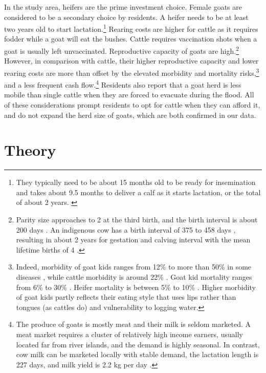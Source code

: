 	In the study area, heifers are the prime investment choice. Female goats are considered to be a secondary choice by residents. A heifer needs to be at least two years old to start lactation.\footnote{They typically need to be about 15 months old to be ready for insemination and takes about 9.5 months to deliver a calf as it starts lactation, or the total of about 2 years. \label{heifer2years}} Rearing costs are higher for cattle as it requires fodder while a goat will eat the bushes. Cattle requires vaccination shots when a goat is usually left unvaccinated. Reproductive capacity of goats are high.\footnote{Parity size approaches to 2 at the third birth, and the birth interval is about 200 days \citep{Hasan2014goat}. An indigenous cow has a birth interval of 375 to 458 days \citep{Hasan2018}, resulting in about 2 years for gestation and calving interval \citep{Habib2012} with the mean lifetime births of 4 \citep[][Table 1]{Hasan2018}. } However, in comparison with cattle, their higher reproductive capacity and lower rearing costs are more than offset by the elevated morbidity and mortality risks,\footnote{Indeed, morbidity of goat kids ranges from 12\% \citep{Mahmud2015} to more than 50\% in some diseases \citep[][Table 5]{Nandi2011}, while cattle morbidity is around 22\% \citep{Bangar2013}. Goat kid mortality ranges from 6\% \citep{Mahmud2015} to 30\% \citep[][Table 5]{Paul2014} \citep{Ershaduzzaman2007}. Heifer mortality is between 5\% \citep[][p.332R]{Hossain2014} to 10\% \citep{Alauddin2018}. Higher morbidity of goat kids partly reflects their eating style that uses lips rather than tongues (as cattles do) and vulnerability to logging water. } and a less frequent cash flow.\footnote{The produce of goats is mostly meat and their milk is seldom marketed. A meat market requires a cluster of relatively high income earners, usually located far from river islands, and the demand is highly seasonal. In contrast, cow milk can be marketed locally with stable demand, the lactation length is 227 days, and milk yield is 2.2 kg per day \citep{Rokonuzzaman2009}. } Residents also report that a goat herd is less mobile than single cattle when they are forced to evacuate during the flood. All of these considerations prompt residents to opt for cattle when they can afford it, and do not expand the herd size of goats, which are both confirmed in our data.

\section{Theory}
\label{SecTheory}

